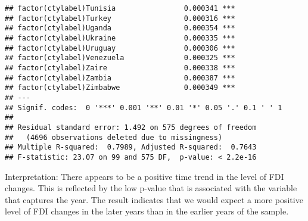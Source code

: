\documentclass[12pt]{article}\usepackage[]{graphicx}\usepackage[]{color}
\makeatletter
\newenvironment{kframe}{%
 \def\at@end@of@kframe{}%
 \ifinner\ifhmode%
  \def\at@end@of@kframe{\end{minipage}}%
  \begin{minipage}{\columnwidth}%
 \fi\fi%
 \def\FrameCommand##1{\hskip\@totalleftmargin \hskip-\fboxsep
 \colorbox{shadecolor}{##1}\hskip-\fboxsep
     \hskip-\linewidth \hskip-\@totalleftmargin \hskip\columnwidth}%
 \MakeFramed {\advance\hsize-\width
   \@totalleftmargin\z@ \linewidth\hsize
   \@setminipage}}%
 {\par\unskip\endMakeFramed%
 \at@end@of@kframe}
\newenvironment{knitrout}{}{} %
\makeatother
\begin{document}
\begin{knitrout}
\begin{kframe}
\begin{verbatim}
## factor(ctylabel)Tunisia                0.000341 ***
## factor(ctylabel)Turkey                 0.000316 ***
## factor(ctylabel)Uganda                 0.000354 ***
## factor(ctylabel)Ukraine                0.000335 ***
## factor(ctylabel)Uruguay                0.000306 ***
## factor(ctylabel)Venezuela              0.000325 ***
## factor(ctylabel)Zaire                  0.000338 ***
## factor(ctylabel)Zambia                 0.000387 ***
## factor(ctylabel)Zimbabwe               0.000349 ***
## ---
## Signif. codes:  0 '***' 0.001 '**' 0.01 '*' 0.05 '.' 0.1 ' ' 1
## 
## Residual standard error: 1.492 on 575 degrees of freedom
##   (4696 observations deleted due to missingness)
## Multiple R-squared:  0.7989,	Adjusted R-squared:  0.7643 
## F-statistic: 23.07 on 99 and 575 DF,  p-value: < 2.2e-16
\end{verbatim}
\end{kframe}
\end{knitrout}

Interpretation: There appears to be a positive time trend in the level of FDI changes. This is reflected by the low p-value that is associated with the variable that captures the year. The result indicates that we would expect a more positive level of FDI changes in the later years than in the earlier years of the sample.
\end{document}
